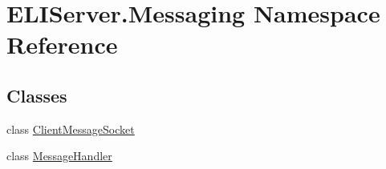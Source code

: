 \hypertarget{namespace_e_l_i_server_1_1_messaging}{}\section{E\+L\+I\+Server.\+Messaging Namespace Reference}
\label{namespace_e_l_i_server_1_1_messaging}
\subsection*{Classes}
\begin{DoxyCompactItemize}
\item 
class \hyperlink{class_e_l_i_server_1_1_messaging_1_1_client_message_socket}{Client\+Message\+Socket}
\item 
class \hyperlink{class_e_l_i_server_1_1_messaging_1_1_message_handler}{Message\+Handler}
\end{DoxyCompactItemize}
